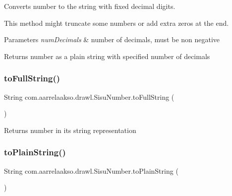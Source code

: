Converts number to the string with fixed decimal digits. 

This method might truncate some numbers or add extra zeros at the end.


\begin{DoxyParams}{Parameters}
{\em num\+Decimals} & number of decimals, must be non negative \\
\hline
\end{DoxyParams}
\begin{DoxyReturn}{Returns}
number as a plain string with specified number of decimals 
\end{DoxyReturn}
\mbox{\label{classcom_1_1aarrelaakso_1_1drawl_1_1_sisu_number_af92a070f5f79dbd684b2c1b8cf423c6f}} 
\subsubsection{\texorpdfstring{to\+Full\+String()}{toFullString()}}
{\footnotesize\ttfamily String com.\+aarrelaakso.\+drawl.\+Sisu\+Number.\+to\+Full\+String (\begin{DoxyParamCaption}{ }\end{DoxyParamCaption})\hspace{0.3cm}{\ttfamily [protected]}}

\begin{DoxyReturn}{Returns}
number in it\textquotesingle{}s string representation 
\end{DoxyReturn}
\mbox{\label{classcom_1_1aarrelaakso_1_1drawl_1_1_sisu_number_af5251e6a7d1f5ed6762394384f2ec604}} 
\subsubsection{\texorpdfstring{to\+Plain\+String()}{toPlainString()}}
{\footnotesize\ttfamily String com.\+aarrelaakso.\+drawl.\+Sisu\+Number.\+to\+Plain\+String (\begin{DoxyParamCaption}{ }\end{DoxyParamCaption})\hspace{0.3cm}{\ttfamily [protected]}}

